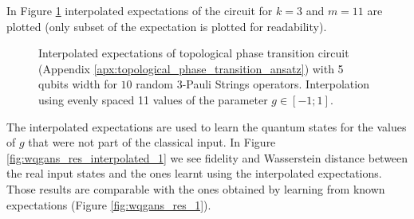 In Figure \ref{fig:phase_exps} interpolated expectations of the circuit for
$k=3$ and $m=11$ are plotted (only subset of the expectation is plotted for readability).

\begin{figure}[htbp!]
  \captionsetup[subfigure]{labelformat=empty}
  \centering
  \caption{Interpolated expectations of topological phase transition circuit (Appendix
    \ref{apx:topological_phase_transition_ansatz}) with 5 qubits width for $10$
    random 3-Pauli Strings operators. Interpolation using evenly
    spaced 11 values of the parameter $g \in [-1; 1]$. 
  }
  \label{fig:phase_exps}
\end{figure}

The interpolated expectations are used to learn the quantum states for
the values of $g$ that were not part of the classical input. In Figure
\ref{fig:wqgans_res_interpolated_1} we see fidelity and Wasserstein distance
between the real input states and the ones learnt using the interpolated
expectations.
Those results are comparable with the ones obtained by learning from known
expectations (Figure \ref{fig:wqgans_res_1}).

